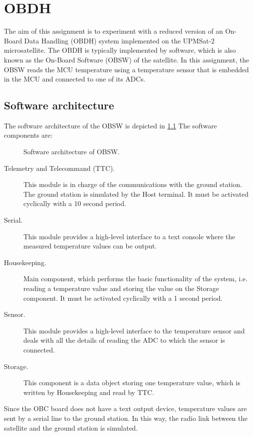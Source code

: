 \chapter{OBDH}\label{ch:obdh}

The aim of this assignment is to experiment with
a reduced version of an On-Board Data Handling (OBDH) system
implemented on the UPMSat-2 microsatellite.
The OBDH is typically implemented by software,
which is also known as the On-Board Software (OBSW) of the satellite.
In this assignment,
the OBSW reads the MCU temperature using a temperature sensor
that is embedded in the MCU and connected to one of its ADCs.

\section{Software architecture}

The software architecture of the OBSW is depicted in \ref{fig:obdh} The software components are:

\begin{figure}[h]
	\caption{Software architecture of OBSW.}
	\label{fig:obdh}
\end{figure}

\begin{description}
\item[Telemetry and Telecommand (TTC).] This module is in charge of the communications with the ground station. The ground station is simulated by the Host terminal. It must be activated cyclically with a 10 second period.
\item[Serial.] This module provides a high-level interface to a text console where the measured temperature values can be output.
\item[Housekeeping.] Main component, which performs the basic functionality of the system, i.e. reading a temperature value and storing the value on the Storage component. It must be activated cyclically with a 1 second period.
\item[Sensor.] This module provides a high-level interface to the temperature sensor and deals with all the details of reading the ADC to which the sensor is connected.
\item[Storage.] This component is a data object storing one temperature value, which is written by Housekeeping and read by TTC.
\end{description}

Since the OBC board does not have a text output device, temperature values are sent by a serial line to the ground station. In this way, the radio link between
the satellite and the ground station is simulated.

